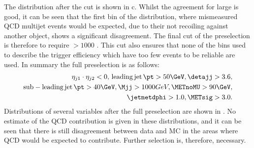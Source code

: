 The \Mjj distribution after the \jetmetdphi cut is shown in c. Whilst the agreement for large \Mjj is good, it can be seen that the first bin of the distribution, where mismeasured \ac{QCD} multijet events would be expected, due to their not recoiling against another object, shows a significant disagreement. The final cut of the preselection is therefore to require \Mjj$>1000$ \GeV. This cut also ensures that none of the bins used to describe the trigger efficiency which have too few events to be reliable are used. In summary the full preselection is as follows:
\begin{equation}
  \label{eq:presel}
  \begin{split}
  \eta_{j1}\cdot\eta_{j2}<0,\,\mathrm{leading\,jet\,}\pt>50 \GeV, \detajj>3.6, \\
  \mathrm{sub-leading\,jet\,}\pt>40 \GeV, \Mjj>1000 GeV, \METnoMU>90\GeV, \\
  \jetmetdphi>1.0, \METsig>3.0.
  \end{split}
\end{equation}
Distributions of several variables after the full preselection are shown in . No estimate of the \ac{QCD} contribution is given in these distributions, and it can be seen that there is still disagreement between data and \ac{MC} in the areas where \ac{QCD} would be expected to contribute. Further selection is, therefore, necessary.

